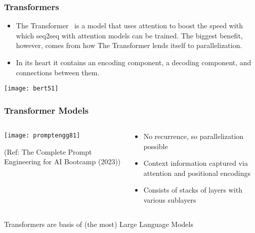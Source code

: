  


\begin{frame}[fragile]\frametitle{Transformers}


\begin{itemize}
\item The Transformer  is a model that uses attention to boost the speed with which seq2seq with attention models can be trained. The biggest benefit, however, comes from how The Transformer lends itself to parallelization. 
\item In its heart it contains an encoding component, a decoding component, and connections between them.
\end{itemize}	 

\begin{center}
\texttt{[image: bert51]}
\end{center}	

\end{frame}

\begin{frame}[fragile]\frametitle{Transformer Models}

\begin{columns}
    \begin{column}[T]{0.7\linewidth}
		\begin{center}
		\texttt{[image: promptengg81]}

		{\tiny (Ref: The Complete Prompt Engineering for AI Bootcamp (2023))}
		\end{center}	
    \end{column}
    \begin{column}[T]{0.3\linewidth}
		\begin{itemize}
		\item  No recurrence, so parallelization possible
		\item  Context information captured via attention and positional encodings
		\item Consists of stacks of layers with various sublayers
		\end{itemize}
    \end{column}
  \end{columns}
  
Transformers are basis of (the most) Large Language Models


\end{frame}



